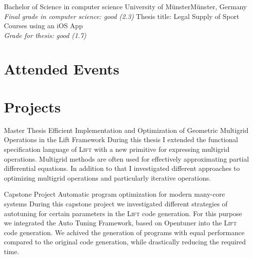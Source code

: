 \documentclass[11pt,a4paper,sans]{moderncv}        %
\newcommand{\Lift}{\textsc{Lift}\xspace}
\begin{document}
                        {Bachelor of Science in computer science}
					{University of Münster}{Münster, Germany}
					{\textit{Final grade in computer science: good (2.3)}}
					{Thesis title: Legal Supply of Sport Courses using an iOS App \\
					 \textit{Grade for thesis: good (1.7)}
					}
					
					

\section{Attended Events}



\section{Projects}
					{Master Thesis}
					{Efficient Implementation and Optimization of Geometric Multigrid Operations in the Lift Framework}{}
					{}
					{During this thesis I extended the functional specification language of \Lift with a new primitive for expressing multigrid operations. Multigrid methods are often used for effectively approximating partial differential equations. In addition to that I investigated different approaches to optimizing multigrid operations and particularly iterative operations.}
    
					{Capstone Project}
					{Automatic program optimization for modern many-core systems}{}
					{}
					{During this capstone project we investigated different strategies of autotuning for certain parameters in the \Lift code generation. For this purpose we integrated the Auto Tuning Framework, based on Opentuner into the \Lift code generation. We achived the generation of programs with equal performance compared to the original code generation, while drastically reducing the required time.}
	
\end{document}
